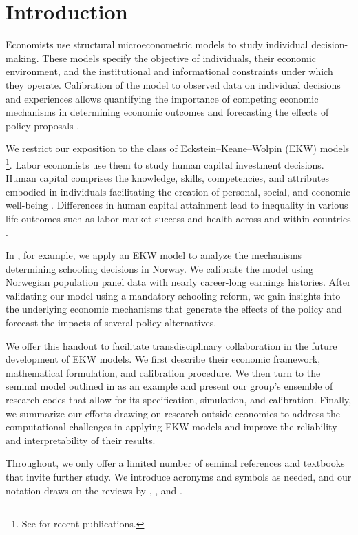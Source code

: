 \section{Introduction}
Economists use structural microeconometric models to study individual decision-making. These models specify the objective of individuals, their economic environment, and the institutional and informational constraints under which they operate. Calibration of the model to observed data on individual decisions and experiences allows quantifying the importance of competing economic mechanisms in determining economic outcomes and forecasting the effects of policy proposals \citep{Wolpin.2013}.

We restrict our exposition to the class of Eckstein--Keane--Wolpin (EKW) models \citep{Aguirregabiria.2010}\footnote{See \citet{Adda.2017, Blundell.2016} for recent publications.}. Labor economists use them to study human capital investment decisions. Human capital comprises the knowledge, skills, competencies, and attributes embodied in individuals facilitating the creation of personal, social, and economic well-being \citep{Becker.1964}. Differences in human capital attainment lead to inequality in various life outcomes such as labor market success and health across and within countries \citep{OECD.2001}.

In \citet{Bhuller.2018}, for example, we apply an EKW model to analyze the mechanisms determining schooling decisions in Norway. We calibrate the model using Norwegian population panel data with nearly career-long earnings histories. After validating our model using a mandatory schooling reform, we gain insights into the underlying economic mechanisms that generate the effects of the policy and forecast the impacts of several policy alternatives.

We offer this handout to facilitate transdisciplinary collaboration in the future development of EKW models. We first describe their economic framework, mathematical formulation, and calibration procedure. We then turn to the seminal model outlined in \citet{Keane.1997} as an example and present our group's ensemble of research codes that allow for its specification, simulation, and calibration. Finally, we summarize our efforts drawing on research outside economics to address the computational challenges in applying EKW models and improve the reliability and interpretability of their results.

Throughout, we only offer a limited number of seminal references and textbooks that invite further study. We introduce acronyms and symbols as needed, and our notation draws on the reviews by \cite{Aguirregabiria.2010}, \cite{Arcidiacono.2011}, and \cite{Puterman.1994}.
